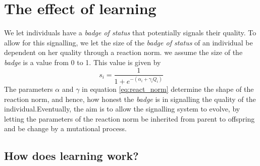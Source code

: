 \documentclass[]{article}
\begin{document}
\hypertarget{the-effect-of-learning}{%
\section{The effect of learning}\label{the-effect-of-learning}}

We let individuals have a \emph{badge of status} that potentially
signals their quality. To allow for this signalling, we let the size of
the \emph{badge of status} of an individual be dependent on her quality
through a reaction norm. we assume the size of the \emph{badge} is a
value from 0 to 1. This value is given by \begin{equation}
s_i = \frac{1}{1+e^{-(\alpha_i+\gamma_iQ_i)}}
\label{eq:react_norm}
\end{equation} The parameters \(\alpha\) and \(\gamma\) in equation
\ref{eq:react_norm} determine the shape of the reaction norm, and hence,
how honest the \emph{badge} is in signalling the quality of the
individual.Eventually, the aim is to allow the signalling system to
evolve, by letting the parameters of the reaction norm be inherited from
parent to offspring and be change by a mutational process.

\hypertarget{how-does-learning-work}{%
\subsection{How does learning work?}\label{how-does-learning-work}}
\end{document}
